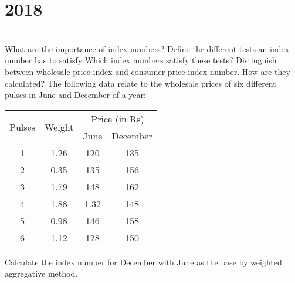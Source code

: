 \section*{2018}
\vspace{-.5cm}
\hrulefill \smallskip\\
 What are the importance of index numbers? Define the different tests an index number has to satisfy Which index numbers satisfy these tests?
\myline
{} Distinguish between wholesale price index and consumer price index number. How are they calculated? The following data relate to the wholesale prices of six different pulses in June and December of a year:
\begin{center}
    \begin{tabular}{|*{4}{c|}}\hline
    \multirow{2}{*}{Pulses} & \multirow{2}{*}{Weight} & \multicolumn{2}{c|}{Price (in Rs)}\\ \cline{3-4}
    & & June & December \\ \hline
    1 & 1.26 & 120 & 135 \\
    2 & 0.35 & 135 & 156 \\
    3 & 1.79 & 148 & 162 \\
    4 & 1.88 & 1.32 & 148 \\
    5 & 0.98 & 146 & 158 \\
    6 & 1.12 & 128 & 150 \\ \hline
    \end{tabular}
\end{center} Calculate the index number for December with June as the base by weighted aggregative method. 
